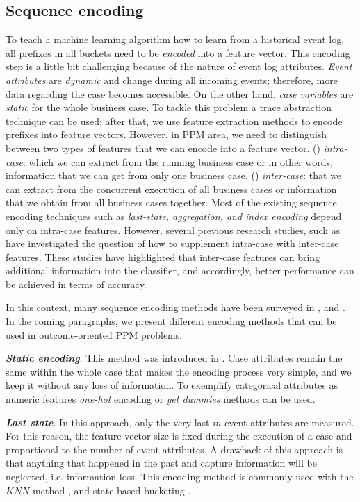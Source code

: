 \subsection{Sequence encoding}
To teach a machine learning algorithm how to learn from a historical event log, all prefixes in all buckets need to be \textit{encoded} into a feature vector. This encoding step is a little bit challenging because of the nature of event log attributes. \textit{Event attributes} are \textit{dynamic} and change during all incoming events; therefore, more data regarding the case becomes accessible. On the other hand, \textit{case variables} are \textit{static} for the whole business case. To tackle this problem a trace abstraction technique \cite{van2010process} can be used; after that, we use feature extraction methods to encode prefixes into feature vectors. However, in PPM area, we need to distinguish between two types of features that we can encode into a feature vector. () \textit{intra-case}: which we can extract from the running business case or in other words, information that we can get from only one business case. () \textit{inter-case}:  that we can extract from the concurrent execution of all business cases or information that we obtain from all business cases together. Most of the existing sequence encoding techniques such as \textit{last-state, aggregation, and index encoding} depend only on intra-case features. However, several previous research studies, such as \cite{senderovich2019knowledge} have investigated the question of how to supplement intra-case with inter-case features. These studies have highlighted that inter-case features can bring additional information into the classifier, and accordingly, better performance can be achieved in terms of accuracy.


 In this context, many sequence encoding methods have been surveyed in \cite{leontjeva2016complex}, and \cite{teinemaa2019outcome}. In the coming paragraphs, we present different encoding methods that can be used in outcome-oriented PPM problems. 

\textbf{\textit{Static encoding}}.
This method was introduced in \cite{leontjeva2016complex}. Case attributes remain the same within the whole case that makes the encoding process very simple, and we keep it without any loss of information. To exemplify categorical attributes as numeric features \textit{one-hot} encoding or \textit{get dummies} methods can be used. 

\textbf{\textit{Last state}}.
 In this approach, only the very last $m$ event attributes are measured. For this reason, the feature vector size is fixed during the execution of a case and proportional to the number of event attributes. A drawback of this approach is that anything that happened in the past and capture information will be neglected, i.e. information loss. This encoding method is commonly used with the $KNN$ method \cite{maggi2014predictive},  and state-based bucketing \cite{conforti2015recommendation}.

